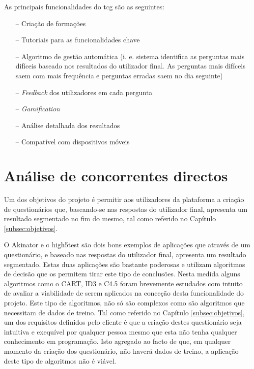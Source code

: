 As principais funcionalidades do  \acrshort{tcg}  são as seguintes:


\begin{itemize}
	\item[--] Criação de formações 
	\item[--] Tutoriais para as funcionalidades chave
	\item[--] Algoritmo de gestão automática (i. e. sistema identifica as perguntas mais difíceis baseado nos resultados do utilizador final. As perguntas mais difíceis saem com mais frequência e perguntas erradas saem no dia seguinte)
	\item[--] \textit{Feedback }dos utilizadores em cada pergunta
	\item[--] \textit{Gamification}
	\item[--] Análise detalhada dos resultados
	\item[--] Compatível com dispositivos móveis
\end{itemize}

\section{Análise de concorrentes directos}

Um dos objetivos do projeto é permitir aos utilizadores da plataforma a criação de questionários que, baseando-se nas respostas do utilizador final, apresenta um resultado  segmentado no fim do mesmo, tal como referido no Capítulo \ref{subsec:objetivos}.

O Akinator\cite{akinator} e o high5test\cite{5} são dois bons exemplos de aplicações que através de um questionário, e baseado nas respostas do utilizador final, apresenta um resultado segmentado. Estas duas aplicações são bastante poderosas e utilizam algoritmos de decisão que os permitem tirar este tipo de conclusões. Nesta medida alguns algoritmos como o CART\cite{cart}, ID3\cite{id3}\cite{id3_2}\cite{cart} e C4.5\cite{cart}\cite{c4.5} foram brevemente estudados com intuito de avaliar a viabilidade de serem aplicados na conceção desta funcionalidade do projeto. Este tipo de algoritmos, não só são complexos como são algoritmos que necessitam de dados de treino. Tal como referido no Capítulo \ref{subsec:objetivos}, um dos requisitos definidos pelo cliente é que a criação destes questionário seja intuitiva e exequível por qualquer pessoa mesmo que esta não tenha qualquer conhecimento em programação. Isto agregado ao facto de que, em qualquer momento da criação dos questionário, não haverá dados de treino, a aplicação deste tipo de algoritmos não é viável.

